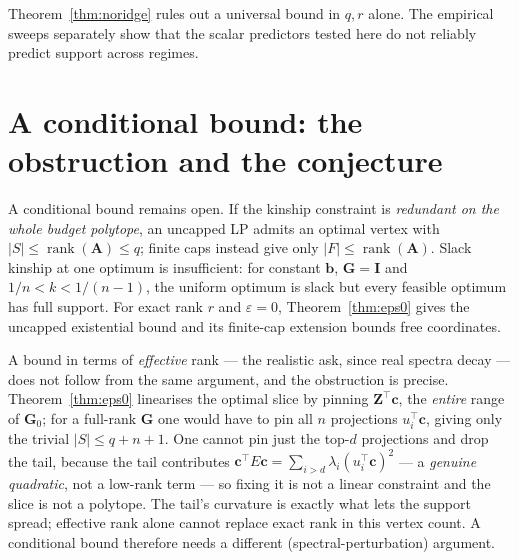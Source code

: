\documentclass[11pt]{article}
\theoremstyle{plain}
\newcommand{\tp}{^{\top}}
\newcommand{\bc}{\mathbf{c}}
\newcommand{\bb}{\mathbf{b}}
\newcommand{\bG}{\mathbf{G}}
\newcommand{\bZ}{\mathbf{Z}}
\newcommand{\bA}{\mathbf{A}}
\begin{document}
Theorem~\ref{thm:noridge} rules out a universal bound in $q,r$ alone. The empirical sweeps separately show that the scalar predictors tested here do not reliably predict support across regimes.

\section{A conditional bound: the obstruction and the conjecture}

A conditional bound remains open. If the kinship constraint is \emph{redundant on the whole budget polytope}, an uncapped LP admits an optimal vertex with $|S|\le\operatorname{rank}(\bA)\le q$; finite caps instead give only $|F|\le\operatorname{rank}(\bA)$. Slack kinship at one optimum is insufficient: for constant $\bb$, $\bG=\mathbf{I}$ and $1/n<k<1/(n-1)$, the uniform optimum is slack but every feasible optimum has full support. For exact rank $r$ and $\varepsilon=0$, Theorem~\ref{thm:eps0} gives the uncapped existential bound and its finite-cap extension bounds free coordinates.

A bound in terms of \emph{effective} rank --- the realistic ask, since real spectra decay --- does
not follow from the same argument, and the obstruction is precise. Theorem~\ref{thm:eps0} linearises
the optimal slice by pinning $\bZ\tp\bc$, the \emph{entire} range of $\bG_0$; for a full-rank $\bG$
one would have to pin all $n$ projections $u_i\tp\bc$, giving only the trivial $|S| \le q + n + 1$.
One cannot pin just the top-$d$ projections and drop the tail, because the tail contributes
$\bc\tp E\bc = \sum_{i>d} \lambda_i (u_i\tp\bc)^2$ --- a \emph{genuine quadratic}, not a low-rank term
--- so fixing it is not a linear constraint and the slice is not a polytope. The tail's curvature is
exactly what lets the support spread; effective rank alone cannot replace exact rank in this vertex count. A conditional bound
therefore needs a different (spectral-perturbation) argument.
\end{document}
